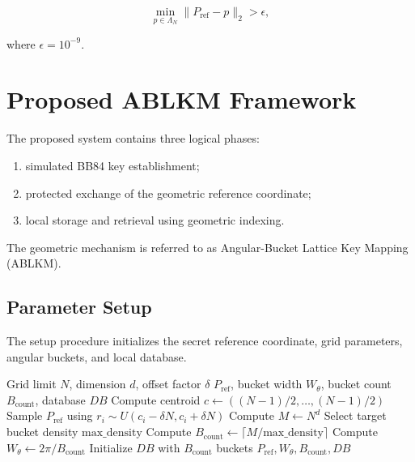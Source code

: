 \documentclass[journal,twocolumn]{IEEEtran}
\begin{document}
\begin{equation}
\min_{p\in\Lambda_N}
\|P_{\mathrm{ref}}-p\|_2>\epsilon,
\end{equation}

where $\epsilon=10^{-9}$.

\section{Proposed ABLKM Framework}

The proposed system contains three logical phases:

\begin{enumerate}
    \item simulated BB84 key establishment;
    \item protected exchange of the geometric reference coordinate;
    \item local storage and retrieval using geometric indexing.
\end{enumerate}

The geometric mechanism is referred to as Angular-Bucket Lattice Key Mapping (ABLKM).

\subsection{Parameter Setup}

The setup procedure initializes the secret reference coordinate, grid parameters, angular buckets, and local database.

\begin{algorithm}[htbp]
\caption{ABLKM Parameter Setup}
\label{alg:setup}
\begin{algorithmic}[1]
\REQUIRE Grid limit $N$, dimension $d$, offset factor $\delta$
\ENSURE $P_{\mathrm{ref}}$, bucket width $W_\theta$, bucket count $B_{\mathrm{count}}$, database $DB$
\STATE Compute centroid $c \leftarrow ((N-1)/2,\ldots,(N-1)/2)$
\REPEAT
    \STATE Sample $P_{\mathrm{ref}}$ using $r_i\sim U(c_i-\delta N,c_i+\delta N)$
\STATE Compute $M\leftarrow N^d$
\STATE Select target bucket density $\mathrm{max\_density}$
\STATE Compute $B_{\mathrm{count}}\leftarrow\lceil M/\mathrm{max\_density}\rceil$
\STATE Compute $W_\theta\leftarrow2\pi/B_{\mathrm{count}}$
\STATE Initialize $DB$ with $B_{\mathrm{count}}$ buckets
\RETURN $P_{\mathrm{ref}},W_\theta,B_{\mathrm{count}},DB$
\end{algorithmic}
\end{algorithm}
\end{document}

